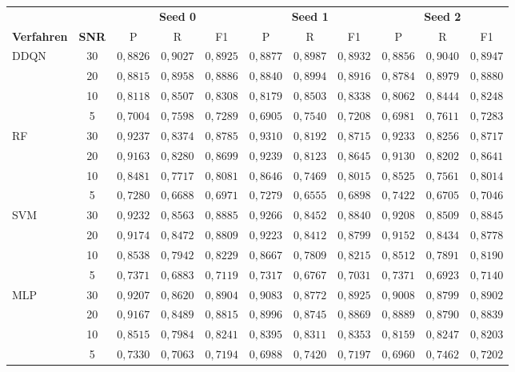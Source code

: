\begin{tabular}{@{}lc*{9}{c}@{}}
\toprule
 & & \multicolumn{3}{c}{\textbf{Seed 0}} & \multicolumn{3}{c}{\textbf{Seed 1}} & \multicolumn{3}{c}{\textbf{Seed 2}} \\
\cmidrule(lr){3-5}\cmidrule(lr){6-8}\cmidrule(lr){9-11}
\textbf{Verfahren} & \textbf{SNR} & P & R & F1 & P & R & F1 & P & R & F1 \\
\midrule
DDQN & 30 & $0{,}8826$ & $0{,}9027$ & $0{,}8925$ & $0{,}8877$ & $0{,}8987$ & $0{,}8932$ & $0{,}8856$ & $0{,}9040$ & $0{,}8947$ \\
 & 20 & $0{,}8815$ & $0{,}8958$ & $0{,}8886$ & $0{,}8840$ & $0{,}8994$ & $0{,}8916$ & $0{,}8784$ & $0{,}8979$ & $0{,}8880$ \\
 & 10 & $0{,}8118$ & $0{,}8507$ & $0{,}8308$ & $0{,}8179$ & $0{,}8503$ & $0{,}8338$ & $0{,}8062$ & $0{,}8444$ & $0{,}8248$ \\
 & 5 & $0{,}7004$ & $0{,}7598$ & $0{,}7289$ & $0{,}6905$ & $0{,}7540$ & $0{,}7208$ & $0{,}6981$ & $0{,}7611$ & $0{,}7283$ \\
\midrule
RF & 30 & $0{,}9237$ & $0{,}8374$ & $0{,}8785$ & $0{,}9310$ & $0{,}8192$ & $0{,}8715$ & $0{,}9233$ & $0{,}8256$ & $0{,}8717$ \\
 & 20 & $0{,}9163$ & $0{,}8280$ & $0{,}8699$ & $0{,}9239$ & $0{,}8123$ & $0{,}8645$ & $0{,}9130$ & $0{,}8202$ & $0{,}8641$ \\
 & 10 & $0{,}8481$ & $0{,}7717$ & $0{,}8081$ & $0{,}8646$ & $0{,}7469$ & $0{,}8015$ & $0{,}8525$ & $0{,}7561$ & $0{,}8014$ \\
 & 5 & $0{,}7280$ & $0{,}6688$ & $0{,}6971$ & $0{,}7279$ & $0{,}6555$ & $0{,}6898$ & $0{,}7422$ & $0{,}6705$ & $0{,}7046$ \\
\midrule
SVM & 30 & $0{,}9232$ & $0{,}8563$ & $0{,}8885$ & $0{,}9266$ & $0{,}8452$ & $0{,}8840$ & $0{,}9208$ & $0{,}8509$ & $0{,}8845$ \\
 & 20 & $0{,}9174$ & $0{,}8472$ & $0{,}8809$ & $0{,}9223$ & $0{,}8412$ & $0{,}8799$ & $0{,}9152$ & $0{,}8434$ & $0{,}8778$ \\
 & 10 & $0{,}8538$ & $0{,}7942$ & $0{,}8229$ & $0{,}8667$ & $0{,}7809$ & $0{,}8215$ & $0{,}8512$ & $0{,}7891$ & $0{,}8190$ \\
 & 5 & $0{,}7371$ & $0{,}6883$ & $0{,}7119$ & $0{,}7317$ & $0{,}6767$ & $0{,}7031$ & $0{,}7371$ & $0{,}6923$ & $0{,}7140$ \\
\midrule
MLP & 30 & $0{,}9207$ & $0{,}8620$ & $0{,}8904$ & $0{,}9083$ & $0{,}8772$ & $0{,}8925$ & $0{,}9008$ & $0{,}8799$ & $0{,}8902$ \\
 & 20 & $0{,}9167$ & $0{,}8489$ & $0{,}8815$ & $0{,}8996$ & $0{,}8745$ & $0{,}8869$ & $0{,}8889$ & $0{,}8790$ & $0{,}8839$ \\
 & 10 & $0{,}8515$ & $0{,}7984$ & $0{,}8241$ & $0{,}8395$ & $0{,}8311$ & $0{,}8353$ & $0{,}8159$ & $0{,}8247$ & $0{,}8203$ \\
 & 5 & $0{,}7330$ & $0{,}7063$ & $0{,}7194$ & $0{,}6988$ & $0{,}7420$ & $0{,}7197$ & $0{,}6960$ & $0{,}7462$ & $0{,}7202$ \\
\bottomrule
\end{tabular}
